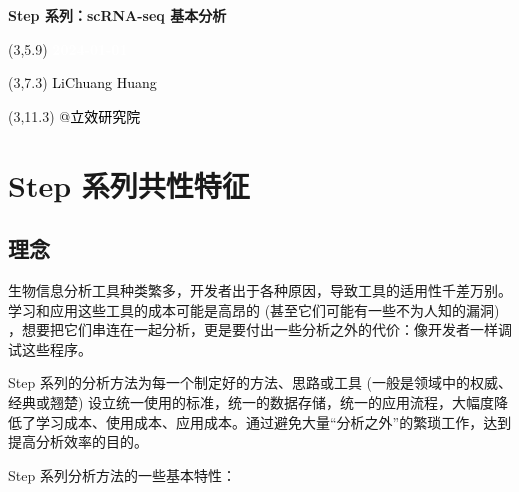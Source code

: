 \documentclass[
]{article}
\author{}
\date{\vspace{-2.5em}}
\begin{document}
\begin{titlepage} 
\begin{center} \textbf{\Huge Step 系列：scRNA-seq
基本分析} \vspace{4em}
\begin{textblock}{10}(3,5.9) \huge
\textbf{\textcolor{white}{2024-01-01}}
\end{textblock} \begin{textblock}{10}(3,7.3)
\Large \textcolor{black}{LiChuang Huang}
\end{textblock} \begin{textblock}{10}(3,11.3)
\Large \textcolor{black}{@立效研究院}
\end{textblock} \end{center} \end{titlepage}
\restoregeometry


\tableofcontents

\listoffigures

\listoftables

\newpage


\hypertarget{step}{%
\section{Step 系列共性特征}\label{step}}

\hypertarget{ux7406ux5ff5}{%
\subsection{理念}\label{ux7406ux5ff5}}

生物信息分析工具种类繁多，开发者出于各种原因，导致工具的适用性千差万别。学习和应用这些工具的成本可能是高昂的 (甚至它们可能有一些不为人知的漏洞) ，想要把它们串连在一起分析，更是要付出一些分析之外的代价：像开发者一样调试这些程序。

Step 系列的分析方法为每一个制定好的方法、思路或工具 (一般是领域中的权威、经典或翘楚) 设立统一使用的标准，统一的数据存储，统一的应用流程，大幅度降低了学习成本、使用成本、应用成本。通过避免大量``分析之外''的繁琐工作，达到提高分析效率的目的。

Step 系列分析方法的一些基本特性：
\end{document}
